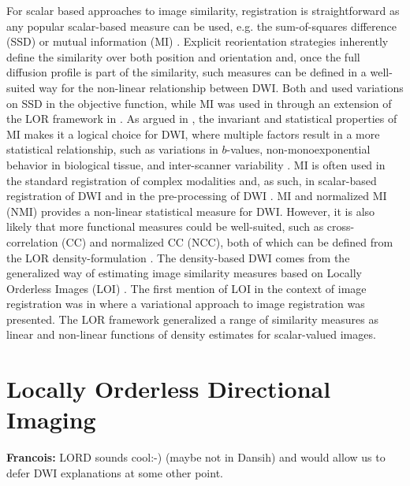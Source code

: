 \documentclass[twocolumn]{svjour3}
\newcommand{\francois}[1]{{\color{red}\textbf{Francois: }#1}}
\newcommand{\francois}[1]{{}}
\begin{document}
For scalar based approaches to image similarity, registration is straightforward as any
popular scalar-based measure can be used, e.g. the sum-of-squares difference (SSD)
\cite{yeo2009dt} or mutual information (MI)
\cite{wells1996mmv,wang2017evaluations}. Explicit reorientation strategies inherently
define the similarity over both position and orientation and, once the full diffusion
profile is part of the similarity, such measures can be defined in a well-suited way for
the non-linear relationship between DWI. Both \cite{zhang2006deformable} and
\cite{yeo2009dt} used variations on SSD in the objective function, while MI was used in
\cite{jensen2015locally} through an extension of the LOR framework in
\cite{darkner2013locally}. As argued in \cite{jensen2015locally}, the invariant and
statistical properties of MI makes it a logical choice for DWI, where multiple factors
result in a more statistical relationship, such as variations in $b$-values,
non-monoexponential behavior in biological tissue, and inter-scanner variability
\cite{johansen2013diffusion}. MI is often used in the standard registration of complex
modalities and, as such, in scalar-based registration of DWI \cite{van2007nonrigid} and in
the pre-processing of DWI \cite{treiber2016characterization}. MI and normalized MI (NMI)
\cite{studholme1999overlap} provides a non-linear statistical measure for DWI. However, it
is also likely that more functional measures could be well-suited, such as
cross-correlation (CC) and normalized CC (NCC), both of which can be defined from the LOR
density-formulation \cite{sporring2011jacobians,darknersporring2012pami}. The
density-based DWI comes from the generalized way of estimating image similarity measures
based on Locally Orderless Images (LOI) \cite{koenderink1999structure}. The first mention
of LOI in the context of image registration was in \cite{hermosillo2002variational} where
a variational approach to image registration was presented. The LOR framework
\cite{darknersporring2011ipmi,darknersporring2012pami} generalized a range of similarity
measures as linear and non-linear functions of density estimates for scalar-valued images.


\section{Locally Orderless Directional Imaging}
\francois{LORD sounds cool:-) (maybe not in Dansih) and would allow us to defer DWI explanations at some other point.} 
\label{sec:lor_dwi}
\end{document}
